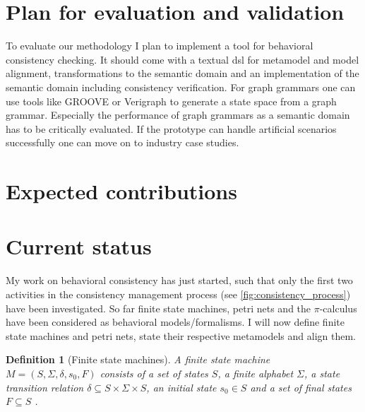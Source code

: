 \documentclass[conference]{IEEEtran}
\newtheorem{definition}{Definition}
\begin{document}
\section{Plan for evaluation and validation}
To evaluate our methodology I plan to implement a tool for behavioral consistency checking.
It should come with a textual \gls{dsl} for metamodel and model alignment, transformations to the semantic domain and an implementation of the semantic domain including consistency verification.
For graph grammars one can use tools like GROOVE \cite{ghamarianModellingAnalysisUsing2012, rensinkGROOVESimulatorTool2004} or Verigraph \cite{costaVerigraphSystemSpecification2016} to generate a state space from a graph grammar.
Especially the performance of graph grammars as a semantic domain has to be critically evaluated.
If the prototype can handle artificial scenarios successfully one can move on to industry case studies.

\section{Expected contributions}


\section{Current status} \label{sec:currentStatus}
My work on behavioral consistency has just started, such that only the first two activities in the consistency management process (see \autoref{fig:consistency_process}) have been investigated.
So far finite state machines, petri nets and the $\pi$-calculus have been considered as behavioral models/formalisms.
I will now define finite state machines and petri nets, state their respective metamodels and align them.

\begin{definition}[Finite state machines] \label{def:fsm}
    A finite state machine $M=(S, \Sigma, \delta, s_0, F)$ consists of a set of states $S$, a finite alphabet $\Sigma$, a state transition relation $\delta \subseteq S \times \Sigma \times S$, an initial state $s_0 \in S$ and a set of final states $F \subseteq S$ \cite{kunzeBehaviouralModelsModelling2016}. %
\end{definition}
\end{document}

